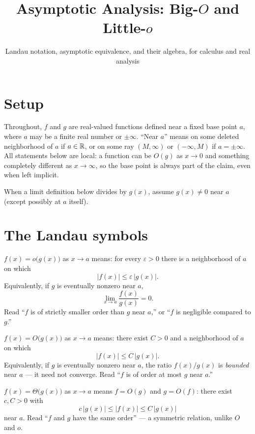 \documentclass{essay}
\title{Asymptotic Analysis: Big-\(O\) and Little-\(o\)}
\subtitle{Landau notation, asymptotic equivalence, and their algebra, for calculus and real analysis}
\author{}
\date{}
\begin{document}
\maketitle

\section{Setup}

Throughout, \(f\) and \(g\) are real-valued functions defined near a fixed base point \(a\), where \(a\) may be a finite real number or \(\pm\infty\). ``Near \(a\)'' means on some deleted neighborhood of \(a\) if \(a\in\mathbb{R}\), or on some ray \((M,\infty)\) or \((-\infty,M)\) if \(a=\pm\infty\). All statements below are local: a function can be \(O(g)\) as \(x\to 0\) and something completely different as \(x\to\infty\), so the base point is always part of the claim, even when left implicit.

\begin{note}
  When a limit definition below divides by \(g(x)\), assume \(g(x)\neq 0\) near \(a\) (except possibly at \(a\) itself).
\end{note}

\section{The Landau symbols}

\begin{definition}[Little-\(o\)]
  \(f(x) = o\big(g(x)\big)\) as \(x\to a\) means: for every \(\varepsilon>0\) there is a neighborhood of \(a\) on which
  \[ |f(x)| \le \varepsilon\,|g(x)|. \]
  Equivalently, if \(g\) is eventually nonzero near \(a\),
  \[ \lim_{x\to a} \frac{f(x)}{g(x)} = 0. \]
  Read ``\(f\) is of strictly smaller order than \(g\) near \(a\),'' or ``\(f\) is negligible compared to \(g\).''
\end{definition}

\begin{definition}[Big-\(O\)]
  \(f(x) = O\big(g(x)\big)\) as \(x\to a\) means: there exist \(C>0\) and a neighborhood of \(a\) on which
  \[ |f(x)| \le C\,|g(x)|. \]
  Equivalently, if \(g\) is eventually nonzero near \(a\), the ratio \(f(x)/g(x)\) is \emph{bounded} near \(a\) --- it need not converge.
  Read ``\(f\) is of order at most \(g\) near \(a\).''
\end{definition}

\begin{definition}
  \(f(x) = \Theta\big(g(x)\big)\) as \(x\to a\) means \(f=O(g)\) and \(g=O(f)\): there exist \(c,C>0\) with
  \[ c\,|g(x)| \le |f(x)| \le C\,|g(x)| \]
  near \(a\). Read ``\(f\) and \(g\) have the same order'' --- a symmetric relation, unlike \(O\) and \(o\).
\end{definition}
\end{document}
